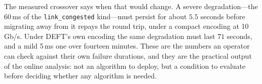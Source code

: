 The measured crossover says when that would change. A severe degradation---the
60\,ms of the \texttt{link\_congested} kind---must persist for about $5.5$
seconds before migrating away from it repays the round trip, under a compact
encoding at 10\,Gb/s. Under DEFT's own encoding the same degradation must last
$71$ seconds, and a mild 5\,ms one over fourteen minutes. These are the numbers an operator can
check against their own failure durations, and they are the practical output of
the online analysis: not an algorithm to deploy, but a condition to evaluate
before deciding whether any algorithm is needed.

